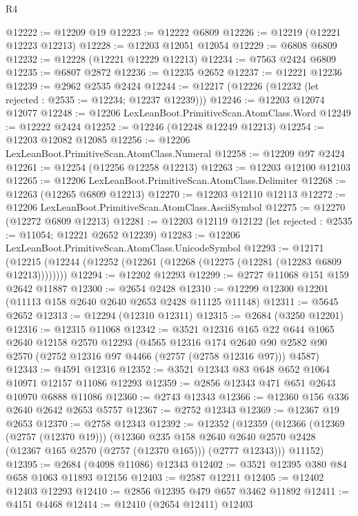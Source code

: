 \begin{lexlean}{R4}
\begin{coremodule}
@12222 := @12209 @19
@12223 := @12222 @6809
@12226 := @12219 (@12221 @12223 @12213)
@12228 := @12203 @12051 @12054
@12229 := @6808 @6809
@12232 := @12228 (@12221 @12229 @12213)
@12234 := @7563 @2424 @6809
@12235 := @6807 @2872
@12236 := @12235 @2652
@12237 := @12221 @12236
@12239 := @2962 @2535 @2424
@12244 := @12217 (@12226 (@12232 (let rejected : @2535 := @12234; @12237 @12239)))
@12246 := @12203 @12074 @12077
@12248 := @12206 LexLeanBoot.PrimitiveScan.AtomClass.Word
@12249 := @12222 @2424
@12252 := @12246 (@12248 @12249 @12213)
@12254 := @12203 @12082 @12085
@12256 := @12206 LexLeanBoot.PrimitiveScan.AtomClass.Numeral
@12258 := @12209 @97 @2424
@12261 := @12254 (@12256 @12258 @12213)
@12263 := @12203 @12100 @12103
@12265 := @12206 LexLeanBoot.PrimitiveScan.AtomClass.Delimiter
@12268 := @12263 (@12265 @6809 @12213)
@12270 := @12203 @12110 @12113
@12272 := @12206 LexLeanBoot.PrimitiveScan.AtomClass.AsciiSymbol
@12275 := @12270 (@12272 @6809 @12213)
@12281 := @12203 @12119 @12122 (let rejected : @2535 := @11054; @12221 @2652 @12239)
@12283 := @12206 LexLeanBoot.PrimitiveScan.AtomClass.UnicodeSymbol
@12293 := @12171
    (@12215 (@12244 (@12252 (@12261 (@12268 (@12275 (@12281 (@12283 @6809 @12213))))))))
@12294 := @12202 @12293
@12299 := @2727 @11068 @151 @159 @2642 @11887
@12300 := @2654 @2428
@12310 := @12299 @12300 @12201 (@11113 @158 @2640 @2640 @2653 @2428 @11125 @11148)
@12311 := @5645 @2652
@12313 := @12294 (@12310 @12311)
@12315 := @2684 (@3250 @12201)
@12316 := @12315 @11068
@12342 := @3521
    @12316
    @165
    @22
    @644
    @1065
    @2640
    @12158
    @2570
    @12293
    (@4565
      @12316
      @174
      @2640
      @90
      @2582
      @90
      @2570
      (@2752 @12316 @97 @4466 (@2757 (@2758 @12316 @97)))
      @4587)
@12343 := @4591 @12316
@12352 := @3521 @12343 @83 @648 @652 @1064 @10971 @12157 @11086 @12293
@12359 := @2856 @12343 @471 @651 @2643 @10970 @6888 @11086
@12360 := @2743 @12343
@12366 := @12360 @156 @336 @2640 @2642 @2653 @5757
@12367 := @2752 @12343
@12369 := @12367 @19 @2653
@12370 := @2758 @12343
@12392 := @12352
    (@12359
      (@12366
        (@12369 (@2757 (@12370 @19)))
        (@12360
          @235
          @158
          @2640
          @2640
          @2570
          @2428
          (@12367 @165 @2570 (@2757 (@12370 @165)))
          (@2777 @12343)))
      @11152)
@12395 := @2684 (@4098 @11086) @12343
@12402 := @3521 @12395 @380 @84 @658 @1063 @11893 @12156
@12403 := @2587 @12211
@12405 := @12402 @12403 @12293
@12410 := @2856 @12395 @479 @657 @3462 @11892
@12411 := @4151 @4468
@12414 := @12410 (@2654 @12411) @12403

\end{coremodule}
\end{lexlean}
